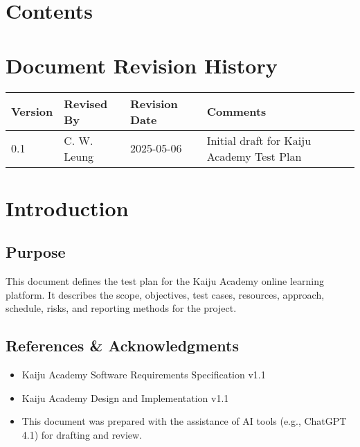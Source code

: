 \documentclass[a4paper,11pt]{scrartcl}
\begin{document}
\section*{Contents}
\tableofcontents
\clearpage

\section*{Document Revision History}
\begin{center}
\begin{tabularx}{\textwidth}{l l l X}
\toprule
Version & Revised By & Revision Date & Comments \\
\midrule
0.1 & C. W. Leung & 2025-05-06 & Initial draft for Kaiju Academy Test Plan \\
\bottomrule

\end{tabularx}
\end{center}

\clearpage
{}


\section{Introduction}

\subsection{Purpose}
This document defines the test plan for the Kaiju Academy online learning platform. It describes the scope, objectives, test cases, resources, approach, schedule, risks, and reporting methods for the project.

\subsection{References & Acknowledgments}
\begin{itemize}[leftmargin=*]
    \item Kaiju Academy Software Requirements Specification v1.1
    \item Kaiju Academy Design and Implementation v1.1
    \item This document was prepared with the assistance of AI tools (e.g., ChatGPT 4.1) for drafting and review.
\end{itemize}
\end{document}
